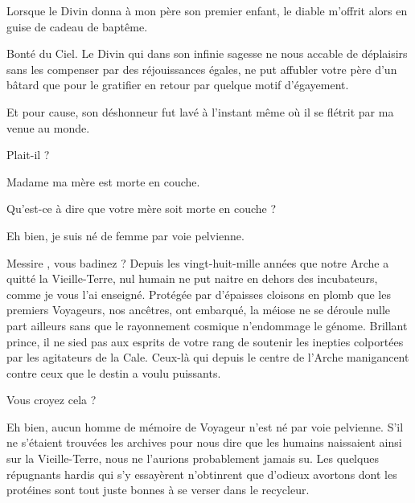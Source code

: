 \act

\scene

\StageDirII{\elena, \alexas}


\begin{drama}
  \elenaspeaks Lorsque le Divin donna à mon père son premier enfant, le diable m’offrit alors en guise de cadeau de baptême. %

  \alexasspeaks Bonté du Ciel. Le Divin qui dans son infinie sagesse ne nous accable de déplaisirs sans les compenser par des réjouissances égales,  ne put affubler votre père d’un bâtard que pour le gratifier en retour par quelque motif d’égayement.

  \elenaspeaks Et pour cause, son déshonneur fut lavé à l’instant même où il se flétrit par ma venue au monde.

  \alexasspeaks Plait-il ?

  \elenaspeaks Madame ma mère est morte en couche.

  \alexasspeaks Qu’est-ce à dire que votre mère soit morte en couche ?

  \elenaspeaks Eh bien, je suis né de femme par voie pelvienne. 

  \alexasspeaks Messire \elena, vous badinez  ? %
                Depuis les vingt-huit-mille années que notre Arche a quitté la Vieille-Terre, nul humain ne put naitre en dehors des incubateurs, comme je vous l’ai enseigné. Protégée par d’épaisses cloisons en plomb que les premiers Voyageurs, nos ancêtres, ont embarqué, la méiose ne se déroule nulle part ailleurs sans que le rayonnement cosmique n’endommage le génome. Brillant prince, il ne sied pas aux esprits de votre rang de soutenir les inepties colportées par les agitateurs de la Cale. Ceux-là qui depuis le centre de l’Arche manigancent contre ceux que le destin a voulu puissants.


  \elenaspeaks Vous croyez cela ?


  \alexasspeaks Eh %
   bien, aucun homme de mémoire de Voyageur n’est né par voie pelvienne. S’il ne s’étaient trouvées les archives pour nous dire que les humains naissaient ainsi sur la Vieille-Terre, nous ne l’aurions probablement jamais su. Les quelques répugnants hardis qui s’y essayèrent n’obtinrent que d’odieux avortons dont les protéines sont tout juste bonnes à se verser dans le recycleur.


\end{drama}
